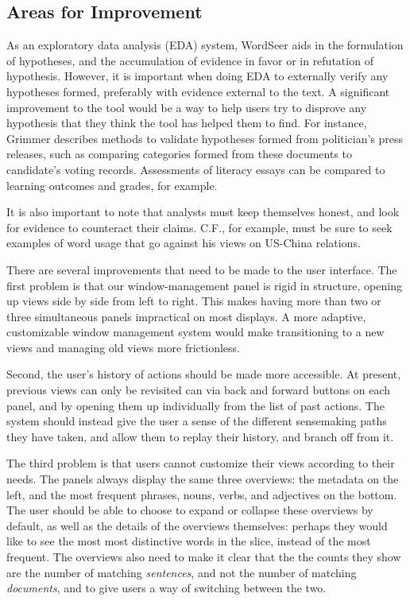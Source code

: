 \subsection{Areas for Improvement}
As an exploratory data analysis (EDA) system, WordSeer aids in the formulation of hypotheses, and the accumulation of evidence in favor or in refutation of hypothesis. However, it is important when doing EDA to externally verify any hypotheses formed, preferably with evidence external to the text.   A significant improvement to the tool would be a way to help users try to disprove any hypothesis that they think the tool has helped them to find. For instance, Grimmer \cite{grimmer} describes methods to validate hypotheses formed from politician's press releases, such as comparing categories formed from these documents to candidate's voting records.  Assessments of literacy essays can be compared to learning outcomes and grades, for example.  

It is also important to note that analysts must keep themselves honest, and look for evidence to counteract their claims. C.F., for example, must be sure to seek examples of word usage that go against his views on US-China relations. 

There are several improvements that need to be made to the user interface. The first problem is that our window-management panel is rigid in structure, opening up views side by side from left to right. This makes having more than two or three simultaneous panels impractical on most displays. A more adaptive, customizable window management system would make transitioning to a new views and managing old views more frictionless.

Second, the user's history of actions should be made more accessible. At present, previous views can only be revisited can via back and forward buttons on each panel, and by opening them up individually from the list of past actions. The system should instead give the user a sense of the different sensemaking paths they have taken, and allow them to replay their history, and branch off from it.

The third problem is that users cannot customize their views according to their needs. The panels always display the same three overviews: the metadata on the left, and the most frequent phrases, nouns, verbs, and adjectives on the bottom. The user should be able to choose to expand or collapse these overviews by default, as well as the details of the overviews themselves: perhaps they would like to see the most most distinctive words in the slice, instead of the most frequent. The overviews also need to make it clear that the the counts they show are the number of matching \emph{sentences}, and not the number of matching \emph{documents}, and to give users a way of switching between the two.

